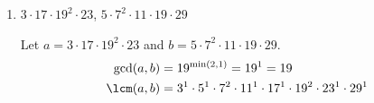 \begin{enumerate}
\begin{enumerate}
\begin{subanswer}
\begin{align*}
    \lcm(a,b) &= 2^{\max(2,0)} \cdot 3^{\max(0,2)} \cdot 5^{\max(7,0)} \cdot 7^{\max(0,5)} \cdot 11^{\max(13,0)} \cdot 13^{\max(0,11)} \\
    &= 2^2 \cdot 3^2 \cdot 5^7 \cdot 7^5 \cdot 11^{13} \cdot 13^{11}
    \end{align*}
  \end{subanswer}
  \item $3 \cdot 17 \cdot 19^2 \cdot 23$, \quad $5 \cdot 7^2 \cdot 11 \cdot 19 \cdot 29$
  \begin{subanswer}
    Let $a = 3 \cdot 17 \cdot 19^2 \cdot 23$ and $b = 5 \cdot 7^2 \cdot 11 \cdot 19 \cdot 29$.
    \begin{align*}
    \gcd(a,b) &= 19^{\min(2,1)} = 19^1 = 19 \\
    \lcm(a,b) &= 3^1 \cdot 5^1 \cdot 7^2 \cdot 11^1 \cdot 17^1 \cdot 19^2 \cdot 23^1 \cdot 29^1
    \end{align*}
  \end{subanswer}
\end{enumerate}





\end{enumerate}
